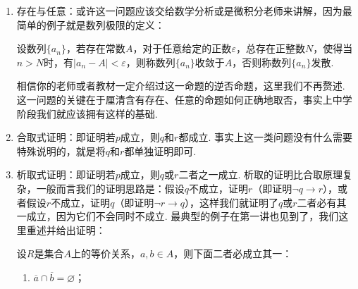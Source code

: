 \begin{enumerate}
          \begin{example*}{}{}
              证明：欧拉常数存在，或者说数列
              \[a_n=1+\dfrac{1}{2}+\cdots+\dfrac{1}{n}-\ln n\]
              有极限（极限值记为$\gamma$，称之为欧拉常数）.
          \end{example*}
          \begin{proof}
              高中熟知对数不等式
              \[\frac{x}{1+x}\leqslant\ln(1+x)\leqslant x,\enspace x>-1,\]
              这一不等式使用求导的方法即可证明，等号成立当且仅当$x=0$，因此我们令$x=\dfrac{1}{n}$，则
              \[\frac{1}{n+1}<\ln\left(1+\frac{1}{n}\right)<\frac{1}{n},\]
              基于此，我们有
              \[a_{n+1}-a_n=\frac{1}{n+1}-\ln\left(1+\frac{1}{n}\right)<0,\]
              因此数列$\{a_n\}$单调递减，又因为
              \begin{align*}
                  a_n & =\sum\limits_{k=1}^n\frac{1}{k}-\ln(\frac{n}{n-1}\cdot \frac{n-1}{n-2}\cdots\frac{2}{1}) \\
                      & =\sum\limits_{k=1}^n\frac{1}{k}-\sum\limits_{k=1}^{n-1}\ln(1+\frac{1}{k})                \\
                      & =\sum\limits_{k=1}^n\left(\frac{1}{k}-\ln(1+\frac{1}{k})\right)+\frac{1}{n}              \\
                      & >\frac{1}{n}>0,
              \end{align*}
              因此数列$\{a_n\}$有下界，因此数列$\{a_n\}$收敛.
          \end{proof}

    \item 存在与任意：或许这一问题应该交给数学分析或是微积分老师来讲解，因为最简单的例子就是数列极限的定义：
          \begin{definition}{}{}
              设数列$\{a_n\}$，若存在常数$A$，对于任意给定的正数$\varepsilon$，总存在正整数$N$，使得当$n>N$时，有$|a_n-A|<\varepsilon$，则称数列$\{a_n\}$收敛于$A$，否则称数列$\{a_n\}$发散.
          \end{definition}

          相信你的老师或者教材一定介绍过这一命题的逆否命题，这里我们不再赘述. 这一问题的关键在于厘清含有存在、任意的命题如何正确地取否，事实上中学阶段我们就应该拥有这样的基础.

    \item 合取式证明：即证明若$p$成立，则$q$和$r$都成立. 事实上这一类问题没有什么需要特殊说明的，就是将$q$和$r$都单独证明即可.

    \item 析取式证明：即证明若$p$成立，则$q$或$r$二者之一成立. 析取的证明比合取原理复杂，一般而言我们的证明思路是：假设$q$不成立，证明$r$（即证明$\lnot q\to r$），或者假设$r$不成立，证明$q$（即证明$\lnot r\to q$），这样我们就证明了$q$或$r$二者必有其一成立，因为它们不会同时不成立. 最典型的例子在第一讲也见到了，我们这里重述并给出证明：
          \begin{theorem}{}{}
              设$R$是集合$A$上的等价关系，$a,b\in A$，则下面二者必成立其一：
              \begin{enumerate}
                  \item $\overline{a}\cap\overline{b}=\varnothing$；


\end{enumerate}
\end{theorem}
\end{enumerate}

